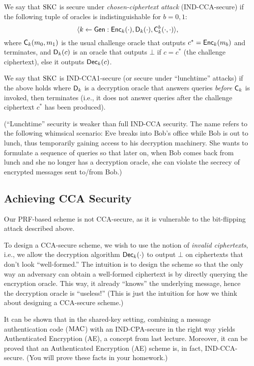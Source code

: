 \documentclass[11pt]{article}
\begin{document}
\begin{definition}
  \label{def:skc-cca}
  We say that $\text{SKC}$ is secure under \emph{chosen-ciphertext attack}
  (IND-CCA-secure) if the following tuple of oracles is
  indistinguishable for $b=0,1$:
  \[ \langle k \gets \mathsf{Gen} : \mathsf{Enc}_{k}(\cdot),
  \mathsf{D}_{k}(\cdot), \mathsf{C}_{k}^{b}(\cdot, \cdot) \rangle, \]
  where $\mathsf{C}_{k}(m_{0},m_{1})$ is the usual challenge oracle that
  outputs $c^{*} = \mathsf{Enc}_{k}(m_{b})$ and terminates, and
  $\mathsf{D}_{k}(c)$ is an oracle that outputs $\bot$ if $c = c^{*}$
  (the challenge ciphertext), else it outputs $\mathsf{Dec}_{k}(c)$.

  We say that $\text{SKC}$ is IND-CCA1-secure (or secure under ``lunchtime''
  attacks) if the above holds where $\mathsf{D}_{k}$ is a decryption
  oracle that answers queries \emph{before} $\mathsf{C}_{k}$ is invoked,
  then terminates (i.e., it does not answer queries after the
  challenge ciphertext $c^{*}$ has been produced).
\end{definition}

(``Lunchtime'' security is weaker than full IND-CCA security.  The
name refers to the following whimsical scenario: Eve breaks into Bob's
office while Bob is out to lunch, thus temporarily gaining access to
his decryption machinery.  She wants to formulate a sequence of
queries so that later on, when Bob comes back from lunch and she no
longer has a decryption oracle, she can violate the secrecy of
encrypted messages sent to/from Bob.)

\subsection{Achieving CCA Security}
\label{sec:achi-cca-secur}

Our PRF-based scheme is not CCA-secure, as it is vulnerable to the
bit-flipping attack described above.  

To design a CCA-secure scheme, we wish to use the notion of
\emph{invalid ciphertexts}, i.e., we allow the decryption algorithm
$\mathsf{Dec}_{k}(\cdot)$ to output $\bot$ on ciphertexts that don't look
``well-formed.''  The intuition is to design the scheme so that the
only way an adversary can obtain a well-formed ciphertext is by
directly querying the encryption oracle.  This way, it already
``knows'' the underlying message, hence the decryption oracle is
``useless!''  (This is just the intuition for how we think about
designing a CCA-secure scheme.)

It can be shown that in the shared-key setting, combining a message
authentication code ($\text{MAC}$) with an IND-CPA-secure in the right way
yields Authenticated Encryption (AE), a concept from last lecture.
Moreover, it can be proved that an Authenticated Encryption (AE)
scheme is, in fact, IND-CCA-secure.  (You will prove these facts in
your homework.)
\end{document}
